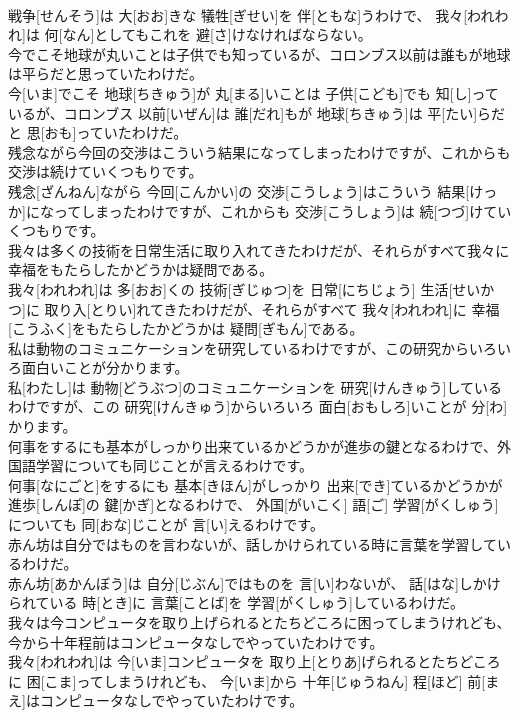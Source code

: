 \documentclass[8pt]{extreport}
\begin{document}
\begin{CJK}{UTF8}{min}
\\	戦争[せんそう]は 大[おお]きな 犠牲[ぎせい]を 伴[ともな]うわけで、 我々[われわれ]は 何[なん]としてもこれを 避[さ]けなければならない。
\\	今でこそ地球が丸いことは子供でも知っているが、コロンブス以前は誰もが地球は平らだと思っていたわけだ。	
\\	今[いま]でこそ 地球[ちきゅう]が 丸[まる]いことは 子供[こども]でも 知[し]っているが、コロンブス 以前[いぜん]は 誰[だれ]もが 地球[ちきゅう]は 平[たい]らだと 思[おも]っていたわけだ。
\\	残念ながら今回の交渉はこういう結果になってしまったわけですが、これからも交渉は続けていくつもりです。	
\\	残念[ざんねん]ながら 今回[こんかい]の 交渉[こうしょう]はこういう 結果[けっか]になってしまったわけですが、これからも 交渉[こうしょう]は 続[つづ]けていくつもりです。
\\	我々は多くの技術を日常生活に取り入れてきたわけだが、それらがすべて我々に幸福をもたらしたかどうかは疑問である。	
\\	我々[われわれ]は 多[おお]くの 技術[ぎじゅつ]を 日常[にちじょう] 生活[せいかつ]に 取り入[とりい]れてきたわけだが、それらがすべて 我々[われわれ]に 幸福[こうふく]をもたらしたかどうかは 疑問[ぎもん]である。
\\	私は動物のコミュニケーションを研究しているわけですが、この研究からいろいろ面白いことが分かります。	
\\	私[わたし]は 動物[どうぶつ]のコミュニケーションを 研究[けんきゅう]しているわけですが、この 研究[けんきゅう]からいろいろ 面白[おもしろ]いことが 分[わ]かります。
\\	何事をするにも基本がしっかり出来ているかどうかが進歩の鍵となるわけで、外国語学習についても同じことが言えるわけです。	
\\	何事[なにごと]をするにも 基本[きほん]がしっかり 出来[でき]ているかどうかが 進歩[しんぽ]の 鍵[かぎ]となるわけで、 外国[がいこく] 語[ご] 学習[がくしゅう]についても 同[おな]じことが 言[い]えるわけです。
\\	赤ん坊は自分ではものを言わないが、話しかけられている時に言葉を学習しているわけだ。	
\\	赤ん坊[あかんぼう]は 自分[じぶん]ではものを 言[い]わないが、 話[はな]しかけられている 時[とき]に 言葉[ことば]を 学習[がくしゅう]しているわけだ。
\\	我々は今コンピュータを取り上げられるとたちどころに困ってしまうけれども、今から十年程前はコンピュータなしでやっていたわけです。	
\\	我々[われわれ]は 今[いま]コンピュータを 取り上[とりあ]げられるとたちどころに 困[こま]ってしまうけれども、 今[いま]から 十年[じゅうねん] 程[ほど] 前[まえ]はコンピュータなしでやっていたわけです。

\end{CJK}
\end{document}
